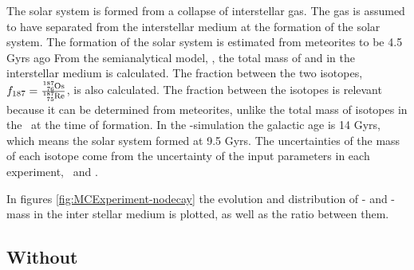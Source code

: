 The solar system is formed from a collapse of interstellar gas. The gas is assumed to have separated from the interstellar medium at the formation of the solar system.
The formation of the solar system is estimated from meteorites to be 4.5 Gyrs ago 
From the semianalytical model, \omegamodel, the total mass of  and  in the interstellar medium is calculated.
The fraction between the two isotopes, $f_{187} = \frac{\os{187}}{\re{187}}$, is also calculated.
The fraction between the isotopes is relevant because it can be determined from meteorites, unlike the total mass of isotopes in the \sos\ at the time of formation.
In the \eris-simulation the galactic age is 14 Gyrs, which means the solar system formed at 9.5 Gyrs.
The uncertainties of the mass of each isotope come from the uncertainty of the input parameters in each experiment, \expone\ and \exptwo.

In figures \ref{fig:MCExperiment-nodecay} the evolution and distribution of - and -mass in the inter stellar medium is plotted, as well as the ratio between them. 

\FloatBarrier %

\subsection{Without \betadecay}
\label{sec:results-nodecay}
\setlength{\subfigwidth}{0.40\textwidth}
\setlength{\figwidth}{0.6\textwidth}

